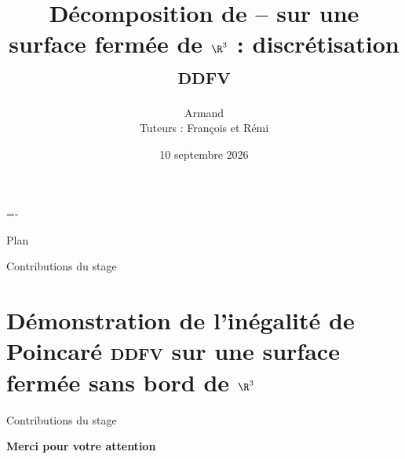 \documentclass[aspectratio=1610]{beamer} %
\title[Soutenance \\ M2 AMS]{Décomposition de \nompropre{Hodge}--\nompropre{de Rham} sur une \\ surface fermée de $\R^3$ : discrétisation \textsc{ddfv}}
\author[Armand \nompropre{Wayoff}]{Armand \nompropre{Wayoff} \\[7pt]
{\small Tuteurs : François \nompropre{Alouges} et Rémi \nompropre{Tesson}}
}
\institute[]{Centre Borelli, ENS Paris-Saclay}
\date{10 septembre 2026}
\let\beamertableofcontents\tableofcontents
\newcommand{\sftxt}[2][1-]{{\color<#1>{myblue}#2}}
\newcommand{\stxt}[2][1-]{\textbf<#1>{\sftxt[#1]{#2}}}
\begin{document}
\begingroup
\makeatletter
\hoffset=-\beamer@leftsidebar
\advance\textwidth\beamer@sidebarwidth
\hsize\textwidth
\columnwidth\textwidth
\makeatother
\begin{frame}[plain]
\addtocounter{framenumber}{-1}
\maketitle
\end{frame}

\begin{frame}[plain]{Plan}
    \addtocounter{framenumber}{-1}
    \beamertableofcontents[hideallsubsections]
\end{frame}
\endgroup



\begin{frame}{Contributions du stage}
\beamertableofcontents[
    sections={2-3},
    hideallsubsections
]
\end{frame}



\section[Démonstration de l'inégalité de Poincaré \ddfv]{Démonstration de l'inégalité de Poincaré \textsc{ddfv} sur une surface fermée sans bord de $\R^3$}

\begin{frame}{Contributions du stage}
    \addtocounter{framenumber}{-1}
    \beamertableofcontents[
        currentsection,
        sections={2-3},
        hideallsubsections,
        sectionstyle=show/shaded
    ]
\end{frame}




\begin{frame}
\addtocounter{framenumber}{-1}
\begin{center}
{\huge \stxt{Merci pour votre attention}}
\end{center}

\end{frame}
\end{document}
